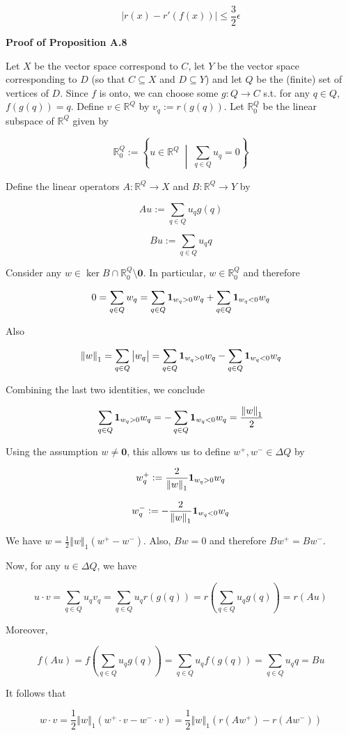 \documentclass[a4paper]{article}
\newcommand{\Co}[1]{}
\newcommand{\AP}[1]{\left(#1\right)}
\newcommand{\ACM}[2]{\left\{#1\;\middle\vert\;#2\right\}}
\newcommand{\Abs}[1]{\left\vert #1 \right\vert}
\newcommand{\Norm}[1]{\left\Vert #1 \right\Vert}
\newcommand{\Reals}{\mathbb{R}}
\DeclareMathOperator{\Ker}{ker}
\begin{document}
$$\Abs{r\AP{x}-r'\AP{f(x)}} \leq \frac{3}{2}\epsilon$$

\textbf{Proof of Proposition A.8}\Co{b}

Let $X$ be the vector space correspond to $C$, let $Y$ be the vector space corresponding to $D$ (so that $C\subseteq X$ and $D\subseteq Y$) and let $Q$ be the (finite) set of vertices of $D$. Since $f$ is onto, we can choose some $g:Q\rightarrow C$ s.t. for any $q\in Q$, $f\AP{g(q)}=q$. Define $v\in\Reals^Q$ by $v_q:=r\AP{g(q)}$. Let $\Reals^Q_0$ be the linear subspace of $\Reals^Q$ given by 

$$\Reals^Q_0:=\ACM{u\in\Reals^Q}{\sum_{q\in Q}u_q = 0}$$

Define the linear operators $A:\Reals^Q\rightarrow X$ and $B:\Reals^Q\rightarrow Y$ by

$$Au:=\sum_{q\in Q}u_q g(q)$$

$$Bu:=\sum_{q\in Q}u_q q$$

Consider any $w\in\Ker{B}\cap\Reals^Q_0\setminus\boldsymbol{0}$. In particular, $w\in\Reals^Q_0$ and therefore

$$0=\sum_{q\in Q}w_q=\sum_{q\in Q}\bold{1}_{w_q>0}w_q+\sum_{q\in Q}\bold{1}_{w_q<0}w_q$$

Also

$$\Norm{w}_1=\sum_{q\in Q}\Abs{w_q}=\sum_{q\in Q}\bold{1}_{w_q>0}w_q-\sum_{q\in Q}\bold{1}_{w_q<0}w_q$$

Combining the last two identities, we conclude

$$\sum_{q\in Q}\bold{1}_{w_q>0}w_q =-\sum_{q\in Q}\bold{1}_{w_q<0}w_q=\frac{\Norm{w}_1}{2}$$

Using the assumption $w\ne\boldsymbol{0}$, this allows us to define $w^+,w^-\in\Delta Q$ by

$$w^+_q:=\frac{2}{\Norm{w}_1}\bold{1}_{w_q>0}w_q$$

$$w^-_q:=-\frac{2}{\Norm{w}_1}\bold{1}_{w_q<0}w_q$$

We have $w=\frac{1}{2}\Norm{w}_1\AP{w^+-w^-}$. Also, $Bw=0$ and therefore $Bw^+=Bw^-$. 

Now, for any $u\in\Delta Q$, we have

$$u\cdot v=\sum_{q\in Q}u_q v_q=\sum_{q\in Q}u_q r\AP{g(q)}=r\AP{\sum_{q\in Q}u_q g(q)}=r\AP{Au}$$ 

Moreover,

$$f\AP{Au}=f\AP{\sum_{q\in Q}u_q g(q)}=\sum_{q\in Q}u_q f\AP{g(q)}=\sum_{q\in Q}u_q q = Bu$$

It follows that

$$w\cdot v=\frac{1}{2}\Norm{w}_1\AP{w^+\cdot v - w^-\cdot v}=\frac{1}{2}\Norm{w}_1\AP{r\AP{Aw^+}-r\AP{Aw^-}}$$
\end{document}
